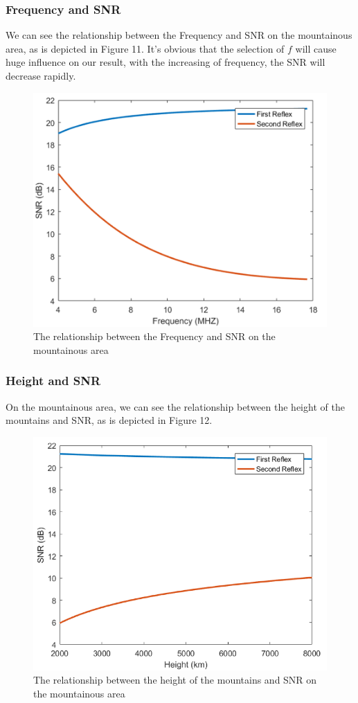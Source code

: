 \documentclass{mcmthesis}
\begin{document}
\subsubsection{Frequency and SNR}
We can see the relationship between the Frequency and SNR on the mountainous area, as is depicted in Figure 11. It's obvious that the selection of $f$ will cause huge influence on our result, with the increasing of frequency, the SNR will decrease rapidly.  
    \begin{figure}[!htbp]
    \centering
    \includegraphics[scale=0.9]{figure/sen_3.png}
    \caption{The relationship between the Frequency and SNR on the mountainous area}
    \label{fig:myphoto12}
    \end{figure} 
    
\subsubsection{Height and SNR}
On the mountainous area, we can see the relationship between the height of the mountains and SNR, as is depicted in Figure 12.
 \begin{figure}[!htbp]
    \centering
    \includegraphics[scale=0.6]{figure/sen_4.png}
    \caption{The relationship between the height of the mountains and SNR on the mountainous area}
    \label{fig:myphoto12}
    \end{figure} 
\end{document}
